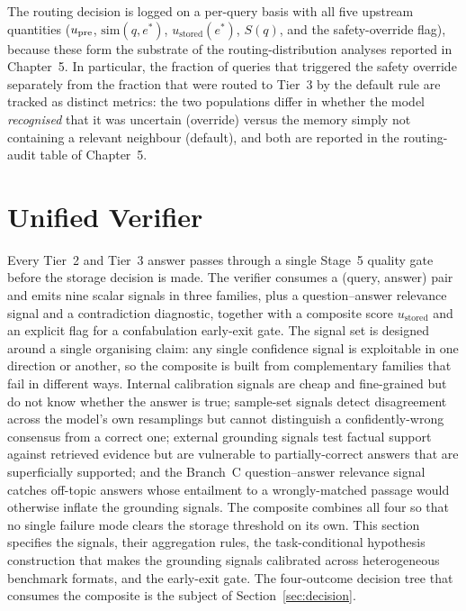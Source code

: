The routing decision is logged on a per-query basis with all five upstream quantities ($u_{\text{pre}}$, $\mathrm{sim}(q, e^{*})$, $u_{\text{stored}}(e^{*})$, $S(q)$, and the safety-override flag), because these form the substrate of the routing-distribution analyses reported in Chapter~5. In particular, the fraction of queries that triggered the safety override separately from the fraction that were routed to Tier~3 by the default rule are tracked as distinct metrics: the two populations differ in whether the model \emph{recognised} that it was uncertain (override) versus the memory simply not containing a relevant neighbour (default), and both are reported in the routing-audit table of Chapter~5.

\section{Unified Verifier}
\label{sec:verifier}

Every Tier~2 and Tier~3 answer passes through a single Stage~5 quality gate before the storage decision is made. The verifier consumes a (query, answer) pair and emits nine scalar signals in three families, plus a question--answer relevance signal and a contradiction diagnostic, together with a composite score $u_{\text{stored}}$ and an explicit flag for a confabulation early-exit gate. The signal set is designed around a single organising claim: any single confidence signal is exploitable in one direction or another, so the composite is built from complementary families that fail in different ways. Internal calibration signals are cheap and fine-grained but do not know whether the answer is true; sample-set signals detect disagreement across the model's own resamplings but cannot distinguish a confidently-wrong consensus from a correct one; external grounding signals test factual support against retrieved evidence but are vulnerable to partially-correct answers that are superficially supported; and the Branch~C question--answer relevance signal catches off-topic answers whose entailment to a wrongly-matched passage would otherwise inflate the grounding signals. The composite combines all four so that no single failure mode clears the storage threshold on its own. This section specifies the signals, their aggregation rules, the task-conditional hypothesis construction that makes the grounding signals calibrated across heterogeneous benchmark formats, and the early-exit gate. The four-outcome decision tree that consumes the composite is the subject of Section~\ref{sec:decision}.

